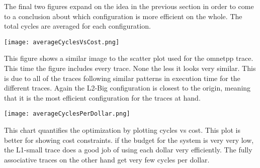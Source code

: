 \documentclass[cacheSimReport.tex]{subfiles}
\begin{document}
\smallskip

The final two figures expand on the idea in the previous section in order to come to a conclusion about which configuration is more efficient on the whole. The total cycles are averaged for each configuration.

\hspace{-.9cm}\texttt{[image: averageCyclesVsCost.png]}

This figure shows a similar image to the scatter plot used for the omnetpp trace. This time the figure includes every trace. None the less it looks very similar. This is due to all of the traces following similar patterns in execution time for the different traces. Again the L2-Big configuration is closest to the origin, meaning that it is the most efficient configuration for the traces at hand.

\hspace{.9cm}\texttt{[image: averageCyclesPerDollar.png]}

This chart quantifies the optimization by plotting cycles vs cost. This plot is better for showing cost constraints. if the budget for the system is very very low, the L1-small trace does a good job of using each dollar very efficiently. The fully associative traces on the other hand get very few cycles per dollar.
\end{document}
